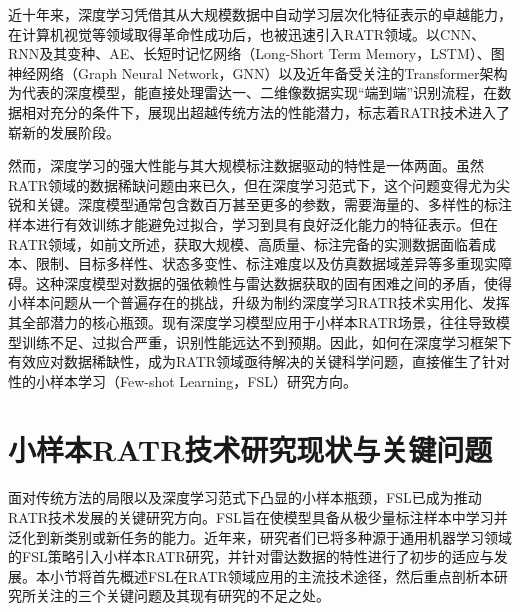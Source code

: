 近十年来，深度学习凭借其从大规模数据中自动学习层次化特征表示的卓越能力，在计算机视觉等领域取得革命性成功后，也被迅速引入RATR领域。以CNN、RNN及其变种、AE、长短时记忆网络（Long-Short Term Memory，LSTM）、图神经网络（Graph Neural Network，GNN）以及近年备受关注的Transformer架构为代表的深度模型，能直接处理雷达一、二维像数据实现“端到端”识别流程，在数据相对充分的条件下，展现出超越传统方法的性能潜力，标志着RATR技术进入了崭新的发展阶段。

然而，深度学习的强大性能与其大规模标注数据驱动的特性是一体两面。虽然RATR领域的数据稀缺问题由来已久，但在深度学习范式下，这个问题变得尤为尖锐和关键。深度模型通常包含数百万甚至更多的参数，需要海量的、多样性的标注样本进行有效训练才能避免过拟合，学习到具有良好泛化能力的特征表示。但在RATR领域，如前文所述，获取大规模、高质量、标注完备的实测数据面临着成本、限制、目标多样性、状态多变性、标注难度以及仿真数据域差异等多重现实障碍。这种深度模型对数据的强依赖性与雷达数据获取的固有困难之间的矛盾，使得小样本问题从一个普遍存在的挑战，升级为制约深度学习RATR技术实用化、发挥其全部潜力的核心瓶颈。现有深度学习模型应用于小样本RATR场景，往往导致模型训练不足、过拟合严重，识别性能远达不到预期。因此，如何在深度学习框架下有效应对数据稀缺性，成为RATR领域亟待解决的关键科学问题，直接催生了针对性的小样本学习（Few-shot Learning，FSL）研究方向。

\section{小样本RATR技术研究现状与关键问题} %
\label{sec:fsl_challenges} %
面对传统方法的局限以及深度学习范式下凸显的小样本瓶颈，FSL已成为推动RATR技术发展的关键研究方向。FSL旨在使模型具备从极少量标注样本中学习并泛化到新类别或新任务的能力。近年来，研究者们已将多种源于通用机器学习领域的FSL策略引入小样本RATR研究，并针对雷达数据的特性进行了初步的适应与发展。本小节将首先概述FSL在RATR领域应用的主流技术途径，然后重点剖析本研究所关注的三个关键问题及其现有研究的不足之处。

